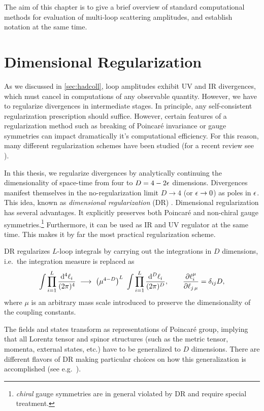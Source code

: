The aim of this chapter is to give a brief overview of standard computational methods for 
evaluation of multi-loop scattering amplitudes, and establish notation at the same time.

\section{Dimensional Regularization}



As we discussed in \cref{sec:hadcoll}, loop amplitudes exhibit UV and IR divergences,
which must cancel in computations of any observable quantity.
However, we have to regularize divergences in intermediate stages.
In principle, any self-consistent regularization prescription should suffice.
However, certain features of a regularization method such as breaking of Poincaré invariance or gauge symmetries
can impact dramatically it's computational efficiency.
For this reason, many different regularization schemes have been studied (for a recent review see \cite{Gnendiger:2017pys}).

In this thesis, we regularize divergences by analytically continuing the dimensionality of space-time from four to $D = 4 - 2\epsilon$ dimensions.
Divergences manifest themselves in the no-regularization limit $D\to4$ (or $\epsilon\to0$) as poles in $\epsilon$.
This idea, known as \emph{dimensional regularization} (DR) \cite{tHooft:1972tcz}.
Dimensional regularization has several advantages.
It explicitly preserves both Poincaré and non-chiral gauge symmetries.\footnote{\emph{chiral} gauge symmetries are in general violated by DR and require special treatment.}
Furthermore, it can be used as IR and UV regulator at the same time.
This makes it by far the most practical regularization scheme.


DR regularizes $L$-loop integrals by carrying out the integrations in $D$ dimensions, i.e.\ the integration measure is replaced as
\begin{equation}
  \int \prod_{i=1}^{L} \frac{\dd[4]{\ell_i}}{(2\pi)^{4}} ~\longrightarrow~ \quantity(\mu^{4-D})^{L}~\int \prod_{i=1}^{L} \frac{\dd[D]{\ell_i}}{(2\pi)^{D}}, \qquad \pdv{\ell^\mu_i}{\ell_{j\,\mu}} = \delta_{i j} D,
  \label{eq:dimregmeasure}
\end{equation}
where $\mu$ is an arbitrary mass scale introduced to preserve the dimensionality of the coupling constants.

The fields and states transform as representations of Poincaré group,
implying that all Lorentz tensor and spinor structures (such as the metric tensor, momenta, external states, etc.\@) have
to be generalized to $D$ dimensions.
There are different flavors of DR making particular choices on how this generalization is accomplished (see e.g.\ \cite{Gnendiger:2017pys}).

